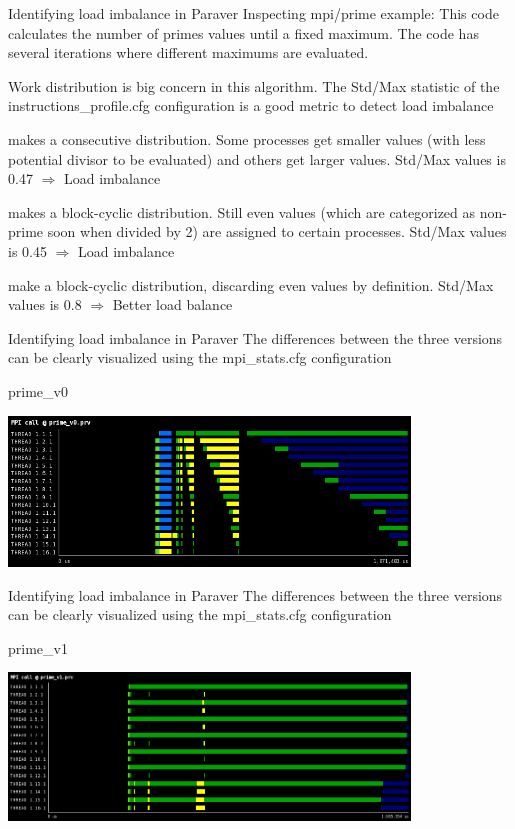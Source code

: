 \documentclass[10pt,xcolor=table]{beamer}
\begin{document}
\begin{frame}{Identifying load imbalance in Paraver}
Inspecting mpi/prime example: This code calculates the number of primes values until a fixed maximum. The code has several iterations where different maximums are evaluated.

Work distribution is big concern in this algorithm. The Std/Max statistic of the instructions\_profile.cfg configuration is a good metric to detect load imbalance
\begin{description}
\footnotesize
\item[prime\_v0] makes a consecutive distribution. Some processes get smaller values (with less potential divisor to be evaluated) and others get larger values. Std/Max values is 0.47 $\Rightarrow$ Load imbalance
\item[prime\_v1] makes a block-cyclic distribution. Still even values (which are categorized as non-prime soon when divided by 2) are assigned to certain processes.  Std/Max values is 0.45 $\Rightarrow$ Load imbalance
\item[prime\_v2] make a block-cyclic distribution, discarding even values by definition.  Std/Max values is 0.8 $\Rightarrow$ Better load balance
\end{description}
\end{frame}

\begin{frame}{Identifying load imbalance in Paraver}
The differences between the three versions can be clearly visualized using the mpi\_stats.cfg configuration

\centering
prime\_v0

\includegraphics[width=0.8\textwidth]{figs/MPI_call@prime_v0.png}

    
\end{frame}

\begin{frame}{Identifying load imbalance in Paraver}
The differences between the three versions can be clearly visualized using the mpi\_stats.cfg configuration

\centering
prime\_v1

\includegraphics[width=0.8\textwidth]{figs/MPI_call@prime_v1.png}

    
\end{frame}
\end{document}
